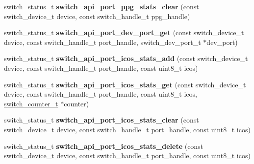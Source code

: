 \begin{DoxyCompactItemize}
\item 
\hypertarget{group__Port_ga53a00e569cbabf4630b22faf0a595418}{switch\+\_\+status\+\_\+t {\bfseries switch\+\_\+api\+\_\+port\+\_\+ppg\+\_\+stats\+\_\+clear} (const switch\+\_\+device\+\_\+t device, const switch\+\_\+handle\+\_\+t ppg\+\_\+handle)}\label{group__Port_ga53a00e569cbabf4630b22faf0a595418}

\item 
\hypertarget{group__Port_gacd1c63c194ea146fa07114f3c42c255b}{switch\+\_\+status\+\_\+t {\bfseries switch\+\_\+api\+\_\+port\+\_\+dev\+\_\+port\+\_\+get} (const switch\+\_\+device\+\_\+t device, const switch\+\_\+handle\+\_\+t port\+\_\+handle, switch\+\_\+dev\+\_\+port\+\_\+t $\ast$dev\+\_\+port)}\label{group__Port_gacd1c63c194ea146fa07114f3c42c255b}

\item 
\hypertarget{group__Port_gac7e005e2a44b82edbc19fa27311b390a}{switch\+\_\+status\+\_\+t {\bfseries switch\+\_\+api\+\_\+port\+\_\+icos\+\_\+stats\+\_\+add} (const switch\+\_\+device\+\_\+t device, const switch\+\_\+handle\+\_\+t port\+\_\+handle, const uint8\+\_\+t icos)}\label{group__Port_gac7e005e2a44b82edbc19fa27311b390a}

\item 
\hypertarget{group__Port_gace2650e146f236e4a68ed5caba909722}{switch\+\_\+status\+\_\+t {\bfseries switch\+\_\+api\+\_\+port\+\_\+icos\+\_\+stats\+\_\+get} (const switch\+\_\+device\+\_\+t device, const switch\+\_\+handle\+\_\+t port\+\_\+handle, const uint8\+\_\+t icos, \hyperlink{structswitch__counter__s}{switch\+\_\+counter\+\_\+t} $\ast$counter)}\label{group__Port_gace2650e146f236e4a68ed5caba909722}

\item 
\hypertarget{group__Port_ga72c13ddd6e820b3a2f1fe1c2cf4a8b2f}{switch\+\_\+status\+\_\+t {\bfseries switch\+\_\+api\+\_\+port\+\_\+icos\+\_\+stats\+\_\+clear} (const switch\+\_\+device\+\_\+t device, const switch\+\_\+handle\+\_\+t port\+\_\+handle, const uint8\+\_\+t icos)}\label{group__Port_ga72c13ddd6e820b3a2f1fe1c2cf4a8b2f}

\item 
\hypertarget{group__Port_ga7318fc1e144a2dd293d5d837dc80dd3a}{switch\+\_\+status\+\_\+t {\bfseries switch\+\_\+api\+\_\+port\+\_\+icos\+\_\+stats\+\_\+delete} (const switch\+\_\+device\+\_\+t device, const switch\+\_\+handle\+\_\+t port\+\_\+handle, const uint8\+\_\+t icos)}\label{group__Port_ga7318fc1e144a2dd293d5d837dc80dd3a}

\end{DoxyCompactItemize}


